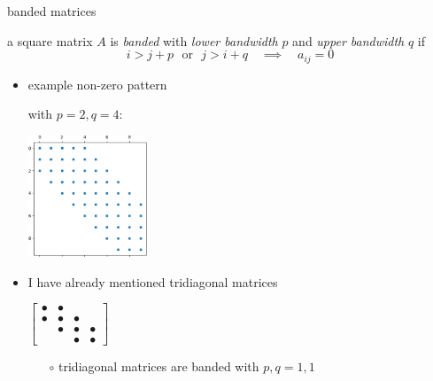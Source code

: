 \documentclass[10pt,
               svgnames,
               hyperref={colorlinks,citecolor=DeepPink4,linkcolor=FireBrick,urlcolor=Maroon},
               usepdftitle=false]{beamer}
\begin{document}
\begin{frame}{banded matrices}

\begin{definition}
a square matrix $A$ is \emph{banded} with \emph{lower bandwidth} $p$ and \emph{upper bandwidth} $q$ if
    $$i > j + p \,\,\text{ or }\,\, j > i + q \quad \implies \quad a_{ij} = 0$$
\end{definition}

\begin{itemize}
\item example non-zero pattern

with $p=2,q=4$:

\vspace{-7mm}
\hspace{55mm} \includegraphics[width=0.28\textwidth]{images/banded.png}

\medskip
\item I have already mentioned tridiagonal matrices

\vspace{-2mm}
\hfill
{\scriptsize $\displaystyle \begin{bmatrix} \bullet & \bullet & & \\ \bullet & \bullet & \bullet & \\ & \bullet & \bullet & \bullet \\ & & \bullet & \bullet \end{bmatrix}$} 

\vspace{-5mm}
   \begin{itemize}
   \item[$\circ$] tridiagonal matrices are banded with $p,q=1,1$
   \end{itemize}
\end{itemize}
\end{frame}
\end{document}
